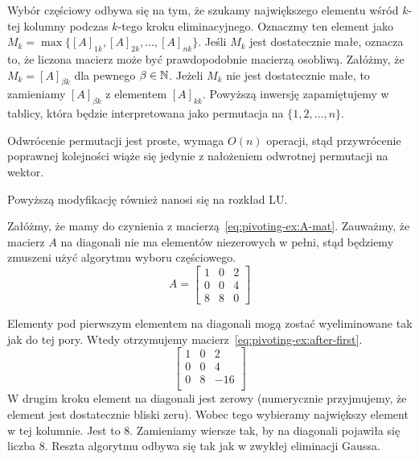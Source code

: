\documentclass[../main.tex]{subfiles}
\begin{document}
    Wybór częściowy odbywa się na tym, że szukamy największego elementu wśród 
    \( k \)-tej kolumny podczas \( k \)-tego kroku eliminacyjnego. Oznaczmy ten element jako
    \( M_k = \max \{ [A]_{1k}, [A]_{2k}, \dotsc, [A]_{nk} \} \). Jeśli \( M_k \) jest
    dostatecznie małe, oznacza to, że liczona macierz może być prawdopodobnie macierzą
    osobliwą. Załóżmy, że \( M_k = [A]_{\beta k} \) dla pewnego \( \beta \in \mathbb{N} \).
    Jeżeli \( M_k \) nie jest dostatecznie małe, to zamieniamy \( [A]_{\beta k} \)
    z elementem \( [A]_{kk} \). Powyższą inwersję zapamiętujemy w tablicy, która
    będzie interpretowana jako permutacja na \( \{ 1, 2, \dotsc, n \} \).

    Odwrócenie permutacji jest proste, wymaga \( O(n) \) operacji, stąd przywrócenie
    poprawnej kolejności wiąże się jedynie z nałożeniem odwrotnej permutacji na wektor.

    Powyższą modyfikację również nanosi się na rozkład LU.

    \begin{example}
      Załóżmy, że mamy do czynienia z macierzą~\ref{eq:pivoting-ex:A-mat}. Zauważmy, że
      macierz \( A \) na diagonali nie ma elementów niezerowych w pełni, stąd 
      będziemy zmuszeni użyć algorytmu wyboru częściowego.
      \begin{equation} \label{eq:pivoting-ex:A-mat}
        A = \begin{bmatrix}
          1   & 0   & 2 \\
          0   & 0   & 4 \\ 
          8   & 8   & 0 
        \end{bmatrix}
      \end{equation}

      Elementy pod pierwszym elementem na diagonali mogą zostać wyeliminowane
      tak jak do tej pory. Wtedy otrzymujemy macierz~\ref{eq:pivoting-ex:after-first}.
      \begin{equation} \label{eq:pivoting-ex:after-first}
        \begin{bmatrix}
          1 & 0 & 2   \\
          0 & 0 & 4   \\
          0 & 8 & -16 \\
        \end{bmatrix}
      \end{equation}
      W drugim kroku element na diagonali jest zerowy (numerycznie przyjmujemy,
      że element jest dostatecznie bliski zeru). Wobec tego wybieramy największy
      element w tej kolumnie. Jest to \( 8 \). Zamieniamy wiersze tak, by
      na diagonali pojawiła się liczba \( 8 \). Reszta algorytmu odbywa się tak
      jak w zwykłej eliminacji Gaussa.
    \end{example}
\end{document}
